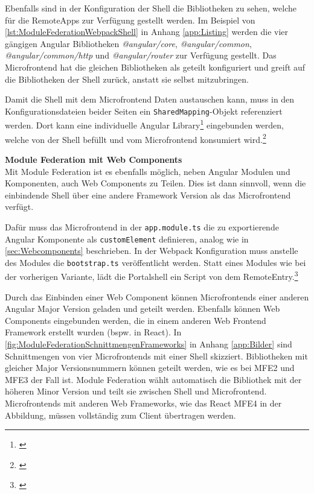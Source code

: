 Ebenfalls sind in der Konfiguration der Shell die Bibliotheken zu sehen, welche für die RemoteApps zur Verfügung gestellt werden. Im Beispiel von \cref{lst:ModuleFederationWebpackShell} in Anhang \ref{app:Listing} werden die vier gängigen Angular Bibliotheken \textit{@angular/core}, \textit{@angular/common}, \textit{@angular/common/http} und \textit{@angular/router} zur Verfügung gestellt. Das Microfrontend hat die gleichen Bibliotheken als geteilt konfiguriert und greift auf die Bibliotheken der Shell zurück, anstatt sie selbst mitzubringen.

Damit die Shell mit dem Microfrontend Daten austauschen kann, muss in den Konfigurationsdateien beider Seiten ein \texttt{SharedMapping}-Objekt referenziert werden. 
Dort kann eine individuelle Angular Library\footnote{\cite[Für weitere Informationen siehe][]{Angular2022h}} eingebunden werden, welche von der Shell befüllt und vom Microfrontend konsumiert wird.\footnote{\cite[vgl.][]{Steyer2021d}}

\textbf{Module Federation mit Web Components}\\
Mit Module Federation ist es ebenfalls möglich, neben Angular Modulen und Komponenten, auch Web Components zu Teilen. Dies ist dann sinnvoll, wenn die einbindende Shell über eine andere Framework Version als das Microfrontend verfügt.

Dafür muss das Microfrontend in der \texttt{app.module.ts} die zu exportierende Angular Komponente als \texttt{customElement} definieren, analog wie in \cref{sec:Webcomponents} beschrieben. In der Webpack Konfiguration muss anstelle des Modules die \texttt{bootstrap.ts} veröffentlicht werden.
Statt eines Modules wie bei der vorherigen Variante, lädt die Portalshell ein Script von dem RemoteEntry.\footnote{\cite[vgl.][]{Steyer2021a}}

Durch das Einbinden einer Web Component können Microfrontends einer anderen Angular Major Version geladen und geteilt werden. Ebenfalls können Web Components eingebunden werden, die in einem anderen Web Frontend Framework erstellt wurden (bspw. in React). In  \cref{fig:ModuleFederationSchnittmengenFrameworks} in Anhang \ref{app:Bilder} sind Schnittmengen von vier Microfrontends mit einer Shell skizziert. Bibliotheken mit gleicher Major Versionsnummern können geteilt werden, wie es bei \gls{MFE2} und \gls{MFE3} der Fall ist. Module Federation wählt automatisch die Bibliothek mit der höheren Minor Version und teilt sie zwischen Shell und Microfrontend. Microfrontends mit anderen Web Frameworks, wie das React \gls{MFE4} in der Abbildung, müssen vollständig zum Client übertragen werden.
 
